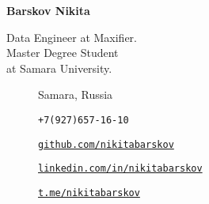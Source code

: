     \Large\textbf{Barskov Nikita}
    \normalsize
    \begin{multicols}{2}
        Data Engineer at Maxifier. \\
        Master Degree Student \\
        at Samara University.
        \begin{description}
            \item[\faMapPin] Samara, Russia
        \end{description}
        \columnbreak
        \begin{description}
            \item[\faPhone] \texttt{+7(927)657-16-10}
            \item[\faGithub] \href{https://github.com/nikitabarskov}{\texttt{github.com/nikitabarskov}}
            \item[\faLinkedin] \href{https://linkedin.com/in/nikitabarskov}{\texttt{linkedin.com/in/nikitabarskov}}
            \item[\faPaperPlane] \href{https://t.me/nikitabarskov}{\texttt{t.me/nikitabarskov}}
        \end{description}
    \end{multicols}